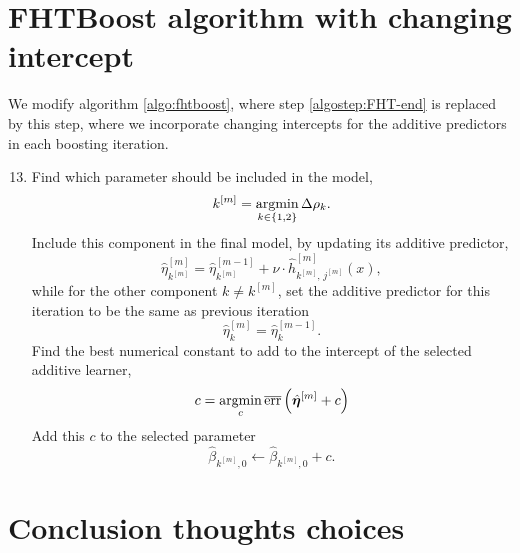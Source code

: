 
\section{FHTBoost algorithm with changing intercept}\label{subsec:FHT-intercept}
We modify algorithm \ref{algo:fhtboost}, where step \ref{algostep:FHT-end} is replaced by this step, where we incorporate changing intercepts for the additive predictors in each boosting iteration.
\label{algo:fhtboost-with-intercept}
\begin{enumerate}
    \setcounter{enumi}{12}
    \item
        Find which parameter should be included in the model,
        \begin{equation*}
            k^{[m]}=\operatorname*{argmin}_{k\in\{1,2\}}\Delta\rho_k.
        \end{equation*}
        Include this component in the final model, by updating its additive predictor,
        \begin{equation*}
            \hat{\eta}^{[m]}_{k^{[m]}}=\hat{\eta}^{[m-1]}_{k^{[m]}}+\nu\cdot\hat{h}^{[m]}_{k^{[m]},\,j^{[m]}}(x),
        \end{equation*}
        while for the other component $k\neq k^{[m]}$, set the additive predictor for this iteration to be the same as previous iteration
        \begin{equation*}
            \hat{\eta}^{[m]}_{k}=\hat{\eta}^{[m-1]}_{k}.
        \end{equation*}
        Find the best numerical constant to add to the intercept of the selected additive learner,
        \begin{equation}
            c=\operatorname*{argmin}_c \overline{\text{err}}\left(\hat{\boldsymbol{\eta}}^{[m]}+c\right)
        \end{equation}
        Add this $c$ to the selected parameter
        \begin{equation}
            \hat{\beta}_{k^{[m]},0}\gets\hat{\beta}_{k^{[m]},0}+c.
        \end{equation}
\end{enumerate}

\section{Conclusion thoughts choices}
